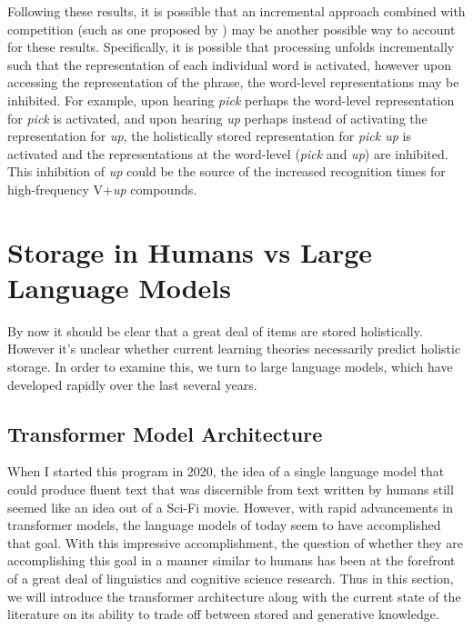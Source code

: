\documentclass[
  12pt,
  letterpaper,
]{scrreport}
\begin{document}
Following these results, it is possible that an incremental approach
combined with competition (such as one proposed by
)
may be another possible way to account for these results. Specifically,
it is possible that processing unfolds incrementally such that the
representation of each individual word is activated, however upon
accessing the representation of the phrase, the word-level
representations may be inhibited. For example, upon hearing \emph{pick}
perhaps the word-level representation for \emph{pick} is activated, and
upon hearing \emph{up} perhaps instead of activating the representation
for \emph{up}, the holistically stored representation for \emph{pick up}
is activated and the representations at the word-level (\emph{pick} and
\emph{up}) are inhibited. This inhibition of \emph{up} could be the
source of the increased recognition times for high-frequency V+\emph{up}
compounds.

\section{Storage in Humans vs Large Language
Models}\label{sec-storage-in-humans-vs-large-language-models}

By now it should be clear that a great deal of items are stored
holistically. However it's unclear whether current learning theories
necessarily predict holistic storage. In order to examine this, we turn
to large language models, which have developed rapidly over the last
several years.

\subsection{Transformer Model
Architecture}\label{transformer-model-architecture}

When I started this program in 2020, the idea of a single language model
that could produce fluent text that was discernible from text written by
humans still seemed like an idea out of a Sci-Fi movie. However, with
rapid advancements in transformer models, the language models of today
seem to have accomplished that goal. With this impressive
accomplishment, the question of whether they are accomplishing this goal
in a manner similar to humans has been at the forefront of a great deal
of linguistics and cognitive science research. Thus in this section, we
will introduce the transformer architecture along with the current state
of the literature on its ability to trade off between stored and
generative knowledge.
\end{document}

